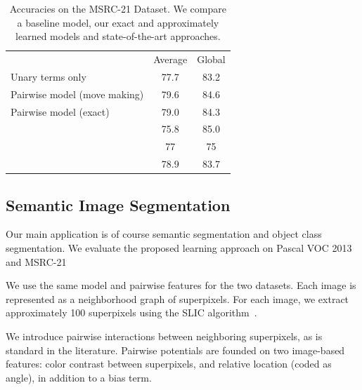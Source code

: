 \begin{table}
    \begin{center}
    \begin{tabularx}{\linewidth}{@{\extracolsep{\fill}}lcc}
        \toprule
                    & Average & Global \\
        \cmidrule{1-3}
    Unary terms only & 77.7& 83.2 \\
    Pairwise model (move making)& 79.6&84.6\\
    Pairwise model (exact)& 79.0 & 84.3\\
        \cmidrule{1-3}
    \citet{ladicky2009associative} & 75.8& 85.0\\
    \citet{gonfaus2010harmony} & 77&  75\\
    \citet{lucchi2013learning} & 78.9& 83.7\\
    \bottomrule
    \end{tabularx}
    \end{center}
    \caption{Accuracies on the MSRC-21 Dataset.  We compare a baseline model,
    our exact and approximately learned models and state-of-the-art
    approaches.}
    
\end{table}




\subsection{Semantic Image Segmentation}
Our main application is of course semantic segmentation and object class
segmentation. We evaluate the proposed learning approach on Pascal VOC 2013 and
MSRC-21

We use the same model and pairwise features for the two datasets.
Each image is represented as a neighborhood graph of superpixels.
For each image, we extract approximately 100 superpixels using 
the SLIC algorithm~\citep{achanta2012slic}.

We introduce pairwise interactions between neighboring superpixels, as is
standard in the literature. Pairwise potentials are founded on two
image-based features: color contrast between superpixels, and relative location
(coded as angle), in addition to a bias term.

